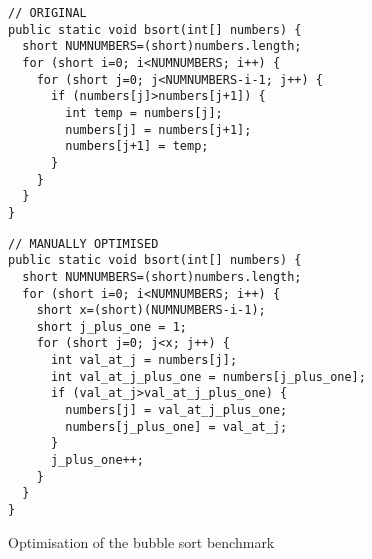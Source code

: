 \begin{listing}[H]
 \centering
 \begin{minipage}[t]{0.45\textwidth}
  \centering
  \begin{verbatim}
// ORIGINAL
public static void bsort(int[] numbers) {
  short NUMNUMBERS=(short)numbers.length;
  for (short i=0; i<NUMNUMBERS; i++) {
    for (short j=0; j<NUMNUMBERS-i-1; j++) {
      if (numbers[j]>numbers[j+1]) {
        int temp = numbers[j];
        numbers[j] = numbers[j+1];
        numbers[j+1] = temp;
      }
    }
  }
}
  \end{verbatim}
 \end{minipage}\hfill
 \begin{minipage}[t]{0.45\textwidth}
  \centering
  \begin{verbatim}
// MANUALLY OPTIMISED
public static void bsort(int[] numbers) {
  short NUMNUMBERS=(short)numbers.length;
  for (short i=0; i<NUMNUMBERS; i++) {
    short x=(short)(NUMNUMBERS-i-1);
    short j_plus_one = 1;
    for (short j=0; j<x; j++) {
      int val_at_j = numbers[j];
      int val_at_j_plus_one = numbers[j_plus_one];
      if (val_at_j>val_at_j_plus_one) {
        numbers[j] = val_at_j_plus_one;
        numbers[j_plus_one] = val_at_j;
      }
      j_plus_one++;
    }
  }
}
  \end{verbatim}
 \end{minipage}
\caption{Optimisation of the bubble sort benchmark}
\label{lst-manual-optimisation}
\end{listing}


